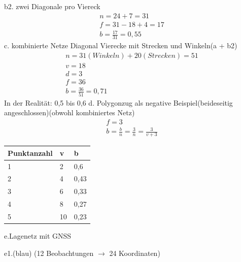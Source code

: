 \documentclass[12pt]{article}
\begin{document}
b2. zwei Diagonale pro Viereck
\begin{gather*}
n = 24 + 7 = 31\\
f = 31 - 18 + 4 = 17\\
b = \frac{17}{31} = 0,55
\end{gather*}
c. kombinierte Netze \newline
Diagonal Vierecke mit Strecken und Winkeln(a + b2)
\begin{gather*}
n = 31(Winkeln) + 20(Strecken) = 51 \\
v = 18\\
d = 3\\
f = 36 \\
b = \frac{36}{51} = 0,71
\end{gather*}
In der Realität: 0,5 bis 0,6 \newline
d. Polygonzug als negative Beispiel(beideseitig angeschlossen)(obwohl kombiniertes Netz)
\begin{gather*}
f = 3\\
b = \frac{b}{n} = \frac{3}{n} = \frac{3}{v + 3}
\end{gather*}
\begin{table}[ht]\centering
	\begin{tabular}{|l|l|l|}
		\hline
		Punktanzahl & v     &   b      \\ \hline
		1      & 2  & 0,6   \\ \hline
		2      & 4  & 0,43  \\ \hline
		3      & 6  & 0,33   \\ \hline
		4      & 8  & 0,27  \\ \hline
		5      & 10  & 0,23   \\ \hline
	\end{tabular}
\end{table}
\newline
e.Lagenetz mit GNSS
\begin{figure}[ht]\centering
\end{figure}
\newline
e1.(blau) (12 Beobachtungen $\longrightarrow$ 24 Koordinaten) \newline
\end{document}
